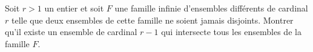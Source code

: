 Soit $r>1$ un entier et soit $F$ une famille infinie d'ensembles différents de cardinal $r$ telle que deux ensembles de cette famille ne soient jamais disjoints. Montrer qu'il existe un ensemble de cardinal $r-1$ qui intersecte tous les ensembles de la famille $F$.